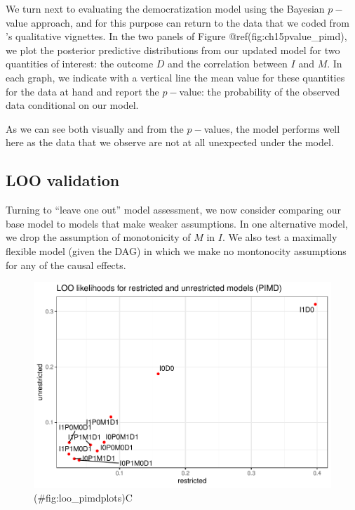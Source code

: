 \documentclass[
  12pt,
]{book}
\begin{document}
We turn next to evaluating the democratization model using the Bayesian \(p-\)value approach, and for this purpose can return to the data that we coded from \citet{haggard2012distributive}'s qualitative vignettes. In the two panels of Figure @ref(fig:ch15pvalue\_pimd), we plot the posterior predictive distributions from our updated model for two quantities of interest: the outcome \(D\) and the correlation between \(I\) and \(M\). In each graph, we indicate with a vertical line the mean value for these quantities for the data at hand and report the \(p-\)value: the probability of the observed data conditional on our model.

As we can see both visually and from the \(p-\)values, the model performs well here as the data that we observe are not at all unexpected under the model.

\hypertarget{loo-validation}{%
\subsection{LOO validation}\label{loo-validation}}

Turning to ``leave one out'' model assessment, we now consider comparing our base model to models that make weaker assumptions. In one alternative model, we drop the assumption of monotonicity of \(M\) in \(I\). We also test a maximally flexible model (given the DAG) in which we make no montonocity assumptions for any of the causal effects.

\begin{figure}
\centering
\includegraphics{ii_files/figure-latex/loo_pimdplots-1.pdf}
\caption{(\#fig:loo\_pimdplots)C}
\end{figure}
\end{document}
